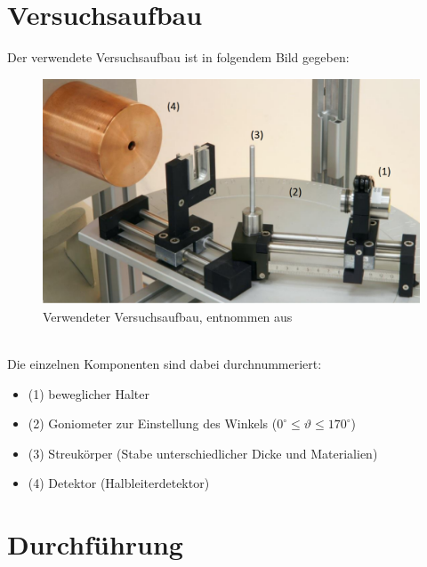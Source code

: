\documentclass[german,  %
parskip=full,  %
]{scrartcl}
\begin{document}
\section{Versuchsaufbau}
Der verwendete Versuchsaufbau ist in folgendem Bild gegeben:
\begin{figure}[h!]\centering
\includegraphics[scale=0.4]{aufbau}
\caption{Verwendeter Versuchsaufbau, entnommen aus \cite{Anleitung}}
\end{figure}
\\
Die einzelnen Komponenten sind dabei durchnummeriert:
\begin{itemize}
\item (1) beweglicher Halter 
\item (2) Goniometer zur Einstellung des Winkels ($0^{\circ} \leq \vartheta \leq 170^{\circ}$)
\item (3) Streukörper (Stabe unterschiedlicher Dicke und Materialien)
\item (4) Detektor (Halbleiterdetektor)
\end{itemize}

\section{Durchführung}
\end{document}
